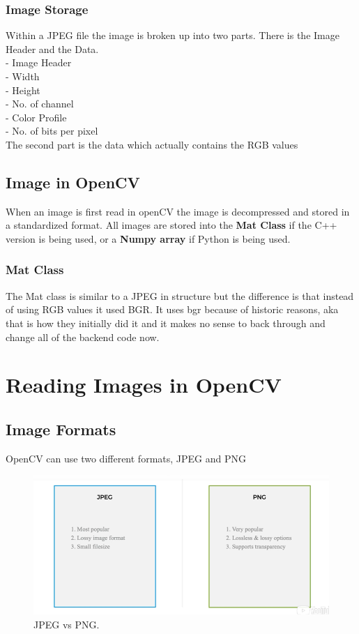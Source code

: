 \documentclass[fleqn]{article}
\begin{document}
    \subsubsection{Image Storage}
    Within a JPEG file the image is broken up into two parts. There is the Image Header and the Data.\\
    \tab - Image Header\\
    \tab\tab - Width\\
    \tab\tab - Height\\
    \tab\tab - No. of channel\\
    \tab\tab - Color Profile\\
    \tab\tab - No. of bits per pixel\\
    The second part is the data which actually contains the RGB values

    \subsection{Image in OpenCV}
    When an image is first read in openCV the image is decompressed and stored in a standardized format. All images are stored into the \textbf{Mat Class} if the C++ version is being used, or a \textbf{Numpy array} if Python is being used.

    \subsubsection{Mat Class}
    The Mat class is similar to a JPEG in structure but the difference is that instead of using RGB values it used BGR. It uses bgr because of historic reasons, aka that is how they initially did it and it makes no sense to back through and change all of the backend code now.

    \newpage
    \clearpage
    \section{Reading Images in OpenCV}
    \subsection{Image Formats}
    OpenCV can use two different formats, JPEG and PNG

    \begin{figure}
    \centering
    \includegraphics[width=325pt]{jpegvspng.png}
    \caption{\label{fig:jpegvspng}JPEG vs PNG.}
    \end{figure}
\end{document}
